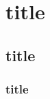 \documentclass{book}
\begin{document}
	\chapter{title}
	\section{title}
	\subsection{title}
\end{document}
